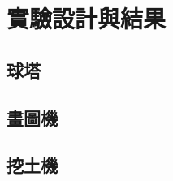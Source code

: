 \documentclass[class=NCU_thesis, crop=false]{standalone}
\begin{document}
\chapter{實驗設計與結果}

\section{球塔}
\section{畫圖機}
\section{挖土機}
\end{document}
